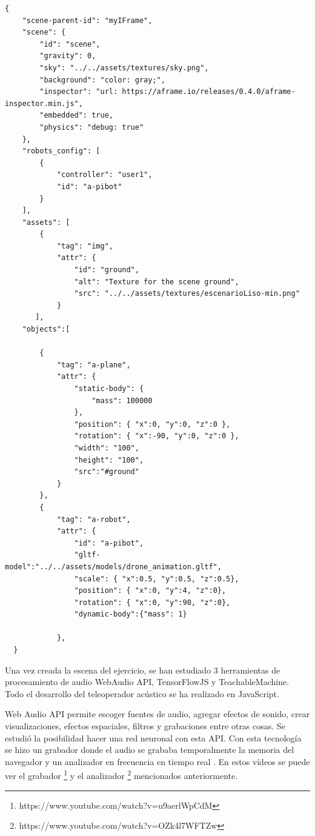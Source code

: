 \begin{lstlisting}
{
    "scene-parent-id": "myIFrame",
    "scene": {
        "id": "scene",
        "gravity": 0,
        "sky": "../../assets/textures/sky.png",
        "background": "color: gray;",
        "inspector": "url: https://aframe.io/releases/0.4.0/aframe-inspector.min.js",
        "embedded": true,
        "physics": "debug: true"
    },
    "robots_config": [
        {
            "controller": "user1",
            "id": "a-pibot"
        }
    ],
    "assets": [
        {
            "tag": "img",
            "attr": {
                "id": "ground",
                "alt": "Texture for the scene ground",
                "src": "../../assets/textures/escenarioLiso-min.png"
            }
       ],
    "objects":[
     
        {
            "tag": "a-plane",
            "attr": {
                "static-body": {
                    "mass": 100000
                },
                "position": { "x":0, "y":0, "z":0 },
                "rotation": { "x":-90, "y":0, "z":0 },
                "width": "100",
                "height": "100",
                "src":"#ground"
            }
        },
        {
            "tag": "a-robot",
            "attr": {
                "id": "a-pibot",
                "gltf-model":"../../assets/models/drone_animation.gltf",
                "scale": { "x":0.5, "y":0.5, "z":0.5},
                "position": { "x":0, "y":4, "z":0},
                "rotation": { "x":0, "y":90, "z":0},
                "dynamic-body":{"mass": 1}

            },      
  }
\end{lstlisting}


Una vez creada la escena del ejercicio, se han estudiado 3 herramientas de procesamiento de audio  WebAudio API, TensorFlowJS y TeachableMachine. Todo el desarrollo del teleoperador acústico se ha realizado en JavaScript.

Web Audio API permite escoger fuentes de audio, agregar efectos de sonido, crear visualizaciones, efectos espaciales, filtros y grabaciones entre otras cosas.
Se estudió la  posibilidad hacer una red neuronal con esta API. Con esta tecnología se hizo un grabador donde el audio se grababa temporalmente la memoria del navegador y un analizador en frecuencia en tiempo real \cite{waa2} .  En estos vídeos se puede ver el grabador \footnote{https://www.youtube.com/watch?v=u9aerlWpCdM} y el analizador \footnote{https://www.youtube.com/watch?v=OZk4l7WFTZw} mencionados anteriormente.

